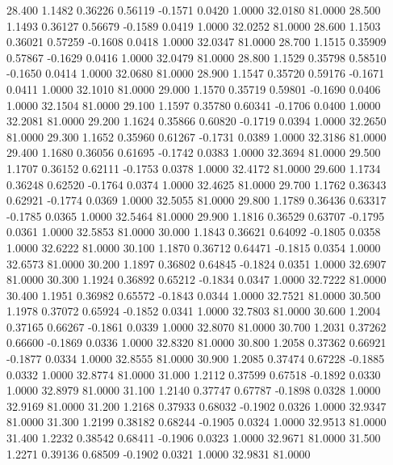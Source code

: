   28.400   1.1482   0.36226   0.56119  -0.1571   0.0420   1.0000  32.0180  81.0000
  28.500   1.1493   0.36127   0.56679  -0.1589   0.0419   1.0000  32.0252  81.0000
  28.600   1.1503   0.36021   0.57259  -0.1608   0.0418   1.0000  32.0347  81.0000
  28.700   1.1515   0.35909   0.57867  -0.1629   0.0416   1.0000  32.0479  81.0000
  28.800   1.1529   0.35798   0.58510  -0.1650   0.0414   1.0000  32.0680  81.0000
  28.900   1.1547   0.35720   0.59176  -0.1671   0.0411   1.0000  32.1010  81.0000
  29.000   1.1570   0.35719   0.59801  -0.1690   0.0406   1.0000  32.1504  81.0000
  29.100   1.1597   0.35780   0.60341  -0.1706   0.0400   1.0000  32.2081  81.0000
  29.200   1.1624   0.35866   0.60820  -0.1719   0.0394   1.0000  32.2650  81.0000
  29.300   1.1652   0.35960   0.61267  -0.1731   0.0389   1.0000  32.3186  81.0000
  29.400   1.1680   0.36056   0.61695  -0.1742   0.0383   1.0000  32.3694  81.0000
  29.500   1.1707   0.36152   0.62111  -0.1753   0.0378   1.0000  32.4172  81.0000
  29.600   1.1734   0.36248   0.62520  -0.1764   0.0374   1.0000  32.4625  81.0000
  29.700   1.1762   0.36343   0.62921  -0.1774   0.0369   1.0000  32.5055  81.0000
  29.800   1.1789   0.36436   0.63317  -0.1785   0.0365   1.0000  32.5464  81.0000
  29.900   1.1816   0.36529   0.63707  -0.1795   0.0361   1.0000  32.5853  81.0000
  30.000   1.1843   0.36621   0.64092  -0.1805   0.0358   1.0000  32.6222  81.0000
  30.100   1.1870   0.36712   0.64471  -0.1815   0.0354   1.0000  32.6573  81.0000
  30.200   1.1897   0.36802   0.64845  -0.1824   0.0351   1.0000  32.6907  81.0000
  30.300   1.1924   0.36892   0.65212  -0.1834   0.0347   1.0000  32.7222  81.0000
  30.400   1.1951   0.36982   0.65572  -0.1843   0.0344   1.0000  32.7521  81.0000
  30.500   1.1978   0.37072   0.65924  -0.1852   0.0341   1.0000  32.7803  81.0000
  30.600   1.2004   0.37165   0.66267  -0.1861   0.0339   1.0000  32.8070  81.0000
  30.700   1.2031   0.37262   0.66600  -0.1869   0.0336   1.0000  32.8320  81.0000
  30.800   1.2058   0.37362   0.66921  -0.1877   0.0334   1.0000  32.8555  81.0000
  30.900   1.2085   0.37474   0.67228  -0.1885   0.0332   1.0000  32.8774  81.0000
  31.000   1.2112   0.37599   0.67518  -0.1892   0.0330   1.0000  32.8979  81.0000
  31.100   1.2140   0.37747   0.67787  -0.1898   0.0328   1.0000  32.9169  81.0000
  31.200   1.2168   0.37933   0.68032  -0.1902   0.0326   1.0000  32.9347  81.0000
  31.300   1.2199   0.38182   0.68244  -0.1905   0.0324   1.0000  32.9513  81.0000
  31.400   1.2232   0.38542   0.68411  -0.1906   0.0323   1.0000  32.9671  81.0000
  31.500   1.2271   0.39136   0.68509  -0.1902   0.0321   1.0000  32.9831  81.0000
